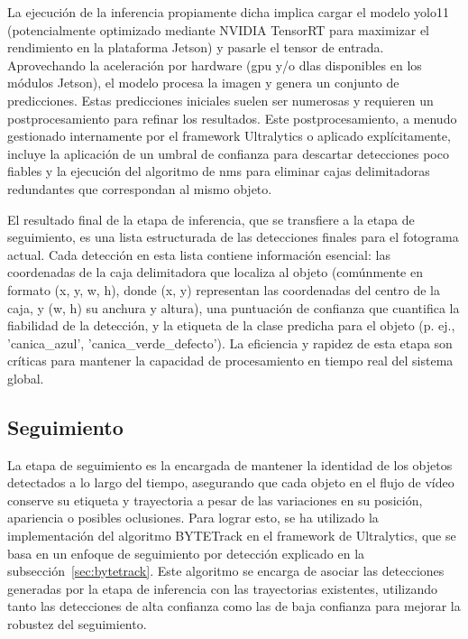 \documentclass[11pt,spanish,listoffigures,listoftables]{tfgetsinf}
\begin{document}
La ejecución de la inferencia propiamente dicha implica cargar el modelo \gls{yolo}11 (potencialmente optimizado mediante NVIDIA TensorRT para maximizar el rendimiento en la plataforma Jetson) y pasarle el tensor de entrada. Aprovechando la aceleración por hardware (\gls{gpu} y/o \gls{dla}s disponibles en los módulos Jetson), el modelo procesa la imagen y genera un conjunto de predicciones. Estas predicciones iniciales suelen ser numerosas y requieren un postprocesamiento para refinar los resultados. Este postprocesamiento, a menudo gestionado internamente por el framework Ultralytics o aplicado explícitamente, incluye la aplicación de un umbral de confianza para descartar detecciones poco fiables y la ejecución del algoritmo de \gls{nms} para eliminar cajas delimitadoras redundantes que correspondan al mismo objeto.

El resultado final de la etapa de inferencia, que se transfiere a la etapa de seguimiento, es una lista estructurada de las detecciones finales para el fotograma actual. Cada detección en esta lista contiene información esencial: las coordenadas de la caja delimitadora que localiza al objeto (comúnmente en formato (x, y, w, h), donde (x, y) representan las coordenadas del centro de la caja, y (w, h) su anchura y altura), una puntuación de confianza que cuantifica la fiabilidad de la detección, y la etiqueta de la clase predicha para el objeto (p. ej., 'canica\_azul', 'canica\_verde\_defecto'). La eficiencia y rapidez de esta etapa son críticas para mantener la capacidad de procesamiento en tiempo real del sistema global.

\subsection{Seguimiento} \label{sec:seguimiento}
La etapa de seguimiento es la encargada de mantener la identidad de los objetos detectados a lo largo del tiempo, asegurando que cada objeto en el flujo de vídeo conserve su etiqueta y trayectoria a pesar de las variaciones en su posición, apariencia o posibles oclusiones. Para lograr esto, se ha utilizado la implementación del algoritmo BYTETrack en el framework de Ultralytics\cite{Jocher_Ultralytics_YOLO_2023}, que se basa en un enfoque de seguimiento por detección explicado en la subsección~\ref{sec:bytetrack}. Este algoritmo se encarga de asociar las detecciones generadas por la etapa de inferencia con las trayectorias existentes, utilizando tanto las detecciones de alta confianza como las de baja confianza para mejorar la robustez del seguimiento.
\end{document}
